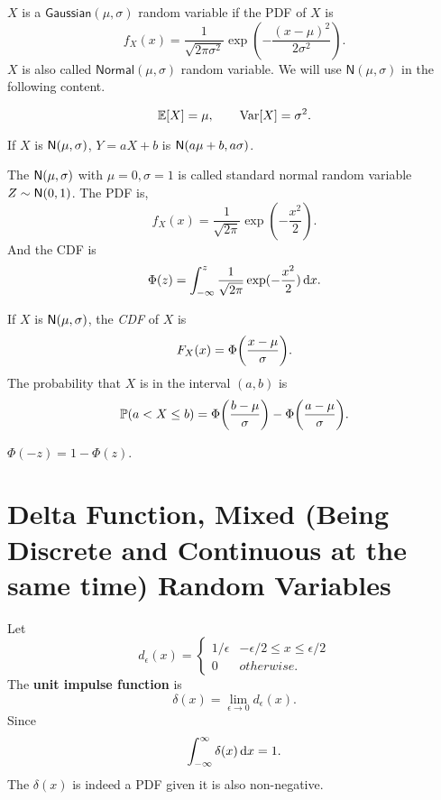 \begin{definition}
    $X$ is a $\mathsf{Gaussian}(\mu, \sigma)$ random variable if the \textnormal{PDF} of $X$ is
    \[f_X(x)=\frac{1}{\sqrt{2\pi\sigma^2}}\exp(-\frac{(x-\mu)^2}{2\sigma^2}).\]
    $X$ is also called $\mathsf{Normal}(\mu,\sigma)$ random variable. We will use $\mathsf{N}(\mu, \sigma)$ in the following content.
\end{definition}

\begin{theorem}
    \[\E{X} = \mu, \qquad \Var[X] = \sigma^2.\]
\end{theorem}

\begin{theorem}
    If $X$ is $\mathsf{N}(\mu,\sigma)$, $Y=aX+b$ is $\mathsf{N}(a\mu+b,a\sigma)$.
\end{theorem}

\begin{definition}
    The $\mathsf{N}(\mu,\sigma)$ with $\mu=0, \sigma=1$ is called standard normal random variable $Z\sim\mathsf{N}(0,1)$. The PDF is,
    \[f_X(x)=\frac{1}{\sqrt{2\pi}}\exp(-\frac{x^2}{2}).\]
    And the CDF is
    \[\Phi(z)=\int_{-\infty}^{z}\frac{1}{\sqrt{2\pi}}\exp(-\frac{x^2}{2})\mathop{}\!\mathrm{d} x.\]
\end{definition}

\begin{theorem}
    If $X$ is $\mathsf{N}(\mu,\sigma)$, the \emph{CDF} of $X$ is
    \[F_X(x)=\Phi\parens*{\frac{x-\mu}{\sigma}}.\]
    The probability that $X$ is in the interval \emph{$(a,b)$} is
    \[\P{a<X\leq b}=\Phi\parens*{\frac{b-\mu}{\sigma}}-\Phi\parens*{\frac{a-\mu}{\sigma}}.\]
\end{theorem}

\begin{theorem}
    $\Phi(-z)=1-\Phi(z)$.
\end{theorem}


\section{Delta Function, Mixed (Being Discrete and Continuous at the same time) Random Variables
}
\begin{definition}
    Let
    \[d_{\epsilon}(x)={
        \begin{cases}
            1/\epsilon & -\epsilon/2\leq x\leq \epsilon/2 \\
            0 & otherwise.
        \end{cases}
    }\]
    The \textbf{unit impulse function} is
    \[\delta(x)=\lim_{\epsilon\rightarrow 0}d_{\epsilon}(x).\]
    Since
    \[\int_{-\infty}^{\infty}\delta(x)\mathop{}\!\mathrm{d} x = 1.\]
    The $\delta(x)$ is indeed a PDF given it is also non-negative.
\end{definition}

